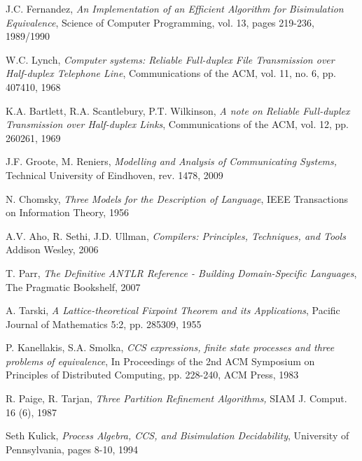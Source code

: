 \begin{thebibliography}{[1]}
J.C. Fernandez, 
\emph{An Implementation of an Efficient Algorithm for Bisimulation
Equivalence}, Science of Computer Programming, vol. 13, pages 219-236, 1989/1990

W.C. Lynch, 
\emph{Computer systems: Reliable Full-duplex File Transmission over Half-duplex Telephone Line},
Communications of the ACM, vol. 11, no. 6, pp. 407410, 1968

K.A. Bartlett, R.A. Scantlebury, P.T. Wilkinson, 
\emph{A note on Reliable Full-duplex Transmission over Half-duplex Links},
Communications of the ACM, vol. 12, pp. 260261, 1969


J.F. Groote, M. Reniers, 
\emph{Modelling and Analysis of Communicating Systems}\emph, 
Technical University of Eindhoven, rev. 1478, 2009


N. Chomsky,
\emph{Three Models for the Description of Language},
IEEE Transactions on Information Theory, 1956

A.V. Aho, R. Sethi, J.D. Ullman,
\emph{Compilers: Principles, Techniques, and Tools}
Addison Wesley, 2006

T. Parr, 
\emph{The Definitive ANTLR Reference - Building Domain-Specific Languages}, 
The Pragmatic Bookshelf, 2007

A. Tarski,
\emph{A Lattice-theoretical Fixpoint Theorem and its Applications},
Pacific Journal of Mathematics 5:2, pp. 285309, 1955

P. Kanellakis, S.A. Smolka,
\emph{CCS expressions, finite state processes and three problems of equivalence},
In Proceedings of the 2nd ACM Symposium on Principles of Distributed Computing, pp. 228-240, ACM Press, 1983

R. Paige, R. Tarjan, 
\emph{Three Partition Refinement Algorithms}\emph, 
SIAM J. Comput. 16 (6), 1987

Seth Kulick,
\emph{Process Algebra, CCS, and Bisimulation Decidability},
University of Pennsylvania, pages 8-10, 1994

%
%

\end{thebibliography}